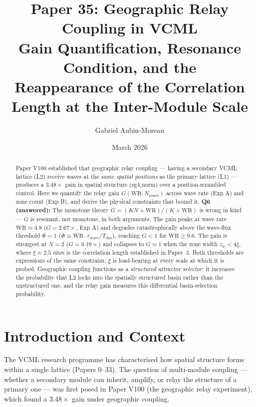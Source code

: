\documentclass[11pt]{article}
\title{\textbf{Paper 35: Geographic Relay Coupling in VCML}\\
\large Gain Quantification, Resonance Condition, and the\\
Reappearance of the Correlation Length at the Inter-Module Scale}
\author{Gabriel Aubin-Moreau}
\date{March 2026}
\begin{document}
\maketitle

\begin{abstract}
Paper V100 established that geographic relay coupling --- having a secondary VCML lattice
(L2) receive waves at the \emph{same spatial positions} as the primary lattice (L1) ---
produces a $3.48\times$ gain in spatial structure ($\mathrm{sg4\_norm}$) over a
position-scrambled control.
Here we quantify the relay gain $G(\mathrm{WR}, N_{\mathrm{zones}})$ across wave
rate (Exp A) and zone count (Exp B), and derive the physical constraints that bound it.
\textbf{Q6 (answered):}
The monotone theory $G = (KN + \mathrm{WR})/(K + \mathrm{WR})$ is wrong in kind ---
$G$ is resonant, not monotone, in both arguments.
The gain peaks at wave rate $\mathrm{WR} \approx 4.8$ ($G = 2.67\times$, Exp A) and
degrades catastrophically above the wave-flux threshold $\Phi = 1$
($\Phi \equiv \mathrm{WR} \cdot r_{\mathrm{wave}} / T_{\mathrm{dur}}$),
reaching $G < 1$ for $\mathrm{WR} \geq 9.6$.
The gain is strongest at $N=2$ ($G = 6.19\times$) and collapses to $G \approx 1$ when
the zone width $z_w < 4\xi$, where $\xi \approx 2.5$ sites is the correlation length
established in Paper~3.
Both thresholds are expressions of the same constraint: $\xi$ is load-bearing at every
scale at which it is probed.
Geographic coupling functions as a \emph{structured attractor selector}: it increases the
probability that L2 locks into the spatially structured basin rather than the unstructured
one, and the relay gain measures this differential basin-selection probability.
\end{abstract}

\section{Introduction and Context}

The VCML research programme has characterised how spatial structure forms within a
single lattice (Papers 0--33). The question of multi-module coupling --- whether a
secondary module can inherit, amplify, or relay the structure of a primary one ---
was first posed in Paper V100 (the geographic relay experiment), which found a $3.48\times$
gain under geographic coupling.
\end{document}
